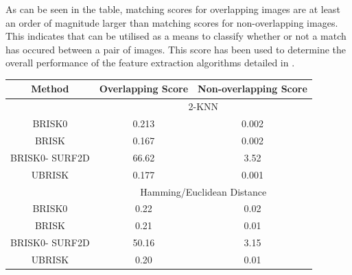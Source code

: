 \documentclass{article}
\begin{document}
As can be seen in the table, matching scores for overlapping images are at least an order of magnitude larger than matching scores for non-overlapping images. This indicates that  can be utilised as a means to classify whether or not a match has occured between a pair of images. This score has been used to determine the overall performance of the feature extraction algorithms detailed in .\\

\begin{table}
\begin{tabular}{|c|c|c|}
\hline 
Method & Overlapping Score & Non-overlapping Score\tabularnewline
\hline 
\hline 
 & \multicolumn{2}{c}{2-KNN}\tabularnewline
\hline 
BRISK0 & 0.213 & 0.002\tabularnewline
\hline 
BRISK & 0.167 & 0.002\tabularnewline
\hline 
BRISK0- SURF2D & 66.62 & 3.52\tabularnewline
\hline 
UBRISK & 0.177 & 0.001\tabularnewline
\hline 
 & \multicolumn{2}{c}{Hamming/Euclidean Distance}\tabularnewline
\hline 
BRISK0 & 0.22 & 0.02\tabularnewline
\hline 
BRISK & 0.21 & 0.01\tabularnewline
\hline 
BRISK0- SURF2D & 50.16 & 3.15\tabularnewline
\hline 
UBRISK & 0.20 & 0.01\tabularnewline
\hline 
\end{tabular}
\label{tab:matchingScoreCompare}
\end{table}
\end{document}
